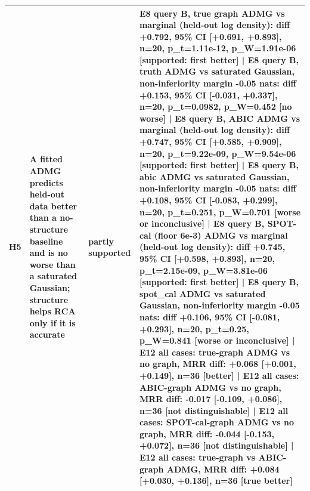 \begin{table}[t]
\begin{tabular}{@{}llll@{}}
H5 & A fitted ADMG predicts held-out data better than a no-structure baseline and is no worse than a saturated Gaussian; structure helps RCA only if it is accurate & partly supported & E8 query B, true graph ADMG vs marginal (held-out log density): diff +0.792, 95\% CI [+0.691, +0.893], n=20, p\_t=1.11e-12, p\_W=1.91e-06 [supported: first better] | E8 query B, truth ADMG vs saturated Gaussian, non-inferiority margin -0.05 nats: diff +0.153, 95\% CI [-0.031, +0.337], n=20, p\_t=0.0982, p\_W=0.452 [no worse] | E8 query B, ABIC ADMG vs marginal (held-out log density): diff +0.747, 95\% CI [+0.585, +0.909], n=20, p\_t=9.22e-09, p\_W=9.54e-06 [supported: first better] | E8 query B, abic ADMG vs saturated Gaussian, non-inferiority margin -0.05 nats: diff +0.108, 95\% CI [-0.083, +0.299], n=20, p\_t=0.251, p\_W=0.701 [worse or inconclusive] | E8 query B, SPOT-cal (floor 6e-3) ADMG vs marginal (held-out log density): diff +0.745, 95\% CI [+0.598, +0.893], n=20, p\_t=2.15e-09, p\_W=3.81e-06 [supported: first better] | E8 query B, spot\_cal ADMG vs saturated Gaussian, non-inferiority margin -0.05 nats: diff +0.106, 95\% CI [-0.081, +0.293], n=20, p\_t=0.25, p\_W=0.841 [worse or inconclusive] | E12 all cases: true-graph ADMG vs no graph, MRR diff: +0.068 [+0.001, +0.149], n=36 [better] | E12 all cases: ABIC-graph ADMG vs no graph, MRR diff: -0.017 [-0.109, +0.086], n=36 [not distinguishable] | E12 all cases: SPOT-cal-graph ADMG vs no graph, MRR diff: -0.044 [-0.153, +0.072], n=36 [not distinguishable] | E12 all cases: true-graph vs ABIC-graph ADMG, MRR diff: +0.084 [+0.030, +0.136], n=36 [true better]\\
\bottomrule
\end{tabular}
\end{table}
